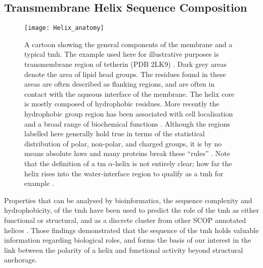 \subsection{Transmembrane Helix Sequence Composition}

\begin{figure}[!ht]
\centering
\texttt{[image: Helix\_anatomy]}
\caption{A cartoon showing the general components of the membrane and a typical \gls{tmh}. The example used here for illustrative purposes is transmembrane region of tetherin (PDB 2LK9) \cite{Skasko2012}. Dark grey areas denote the area of lipid head groups. The residues found in these areas are often described as flanking regions, and are often in contact with the aqueous interface of the membrane. The helix core is mostly composed of hydrophobic residues. More recently the hydrophobic group region has been associated with cell localisation and a broad range of biochemical functions \cite{Junne2010, Wong2012}. Although the regions labelled here generally hold true in terms of the statistical distribution of polar, non-polar, and charged groups, it is by no means absolute laws and many proteins break these ``rules'' \cite{Sharpe2010, Baeza-Delgado2013, Pogozheva2013}. Note that the definition of a \gls{tm} $\alpha$-helix is not entirely clear; how far the helix rises into the water-interface region to qualify as a \gls{tmh} for example \cite{VonHeijne2006}.}
\label{fig:helixcartoon1}
\end{figure}




Properties that can be analysed by bioinformatics, the sequence complexity and hydrophobicity, of the \gls{tmh} have been used to predict the role of the \gls{tmh} as either functional or structural, and as a discrete cluster from other SCOP annotated helices \cite{Wong2012}. Those findings demonstrated that the sequence of the \gls{tmh} holds valuable information regarding biological roles, and forms the basis of our interest in the link between the polarity of a helix and functional activity beyond structural anchorage.


